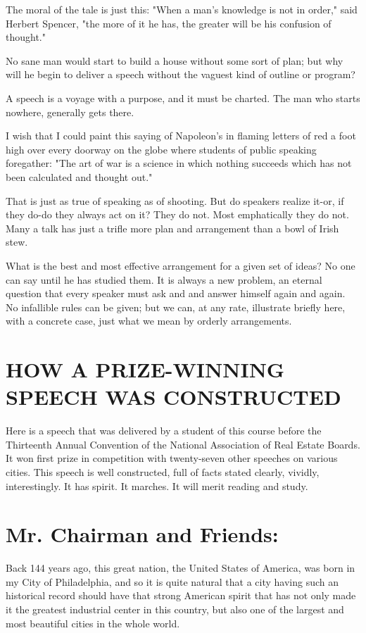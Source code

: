 \documentclass[10pt]{article}
\begin{document}
The moral of the tale is just this: "When a man's knowledge is not in order," said Herbert Spencer, "the more of it he has, the greater will be his confusion of thought."

No sane man would start to build a house without some sort of plan; but why will he begin to deliver a speech without the vaguest kind of outline or program?

A speech is a voyage with a purpose, and it must be charted. The man who starts nowhere, generally gets there.

I wish that I could paint this saying of Napoleon's in flaming letters of red a foot high over every doorway on the globe where students of public speaking foregather: "The art of war is a science in which nothing succeeds which has not been calculated and thought out."

That is just as true of speaking as of shooting. But do speakers realize it-or, if they do-do they always act on it? They do not. Most emphatically they do not. Many a talk has just a trifle more plan and arrangement than a bowl of Irish stew.

What is the best and most effective arrangement for a given set of ideas? No one can say until he has studied them. It is always a new problem, an eternal question that every speaker must ask and and answer himself again and again. No infallible rules can be given; but we can, at any rate, illustrate briefly here, with a concrete case, just what we mean by orderly arrangements.

\section*{HOW A PRIZE-WINNING SPEECH WAS CONSTRUCTED}
Here is a speech that was delivered by a student of this course before the Thirteenth Annual Convention of the National Association of Real Estate Boards. It won first prize in competition with twenty-seven other speeches on various cities. This speech is well constructed, full of facts stated clearly, vividly, interestingly. It has spirit. It marches. It will merit reading and study.

\section*{Mr. Chairman and Friends:}
Back 144 years ago, this great nation, the United States of America, was born in my City of Philadelphia, and so it is quite natural that a city having such an historical record should have that strong American spirit that has not only made it the greatest industrial center in this country, but also one of the largest and most beautiful cities in the whole world.
\end{document}

